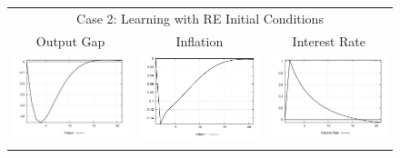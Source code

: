 \begin{figure}
\begin{tabular}{ccc}
\multicolumn{3}{c}{Case 2: Learning with RE Initial Conditions}\\
Output Gap & Inflation & Interest Rate \\ 
\includegraphics[scale=0.28]{results_reallinit/Output_mpshock_irf.png} & 
\includegraphics[scale=0.28]{results_reallinit/Inflation_mpshock_irf.png} & 
\includegraphics[scale=0.28]{results_reallinit/Interest_Rate_mpshock_irf.png} \\ \\ 

\end{tabular}
\end{figure}
